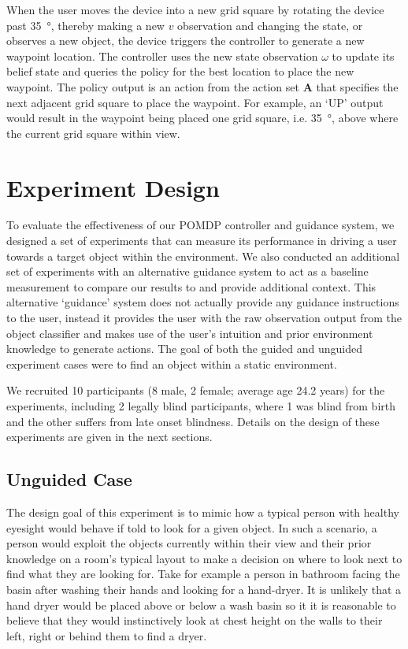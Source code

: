 \documentclass[runningheads]{llncs}
\begin{document}
When the user moves the device into a new grid square by rotating the device past \SI{35}{\degree}, thereby making a new $v$ observation and changing the state, or observes a new object, the device triggers the controller to generate a new waypoint location.
The controller uses the new state observation $\omega$ to update its belief state and queries the policy for the best location to place the new waypoint. 
The policy output is an action from the action set $\mathbf{A}$ that specifies the next adjacent grid square to place the waypoint.
For example, an `UP' output would result in the waypoint being placed one grid square, i.e. \SI{35}{\degree}, above where the current grid square within view. 

\section{Experiment Design}\label{sec:experiments}

To evaluate the effectiveness of our POMDP controller and guidance system, we designed a set of experiments that can measure its performance in driving a user towards a target object within the environment. 
We also conducted an additional set of experiments with an alternative guidance system to act as a baseline measurement to compare our results to and provide additional context. 
This alternative `guidance' system does not actually provide any guidance instructions to the user, instead it provides the user with the raw observation output from the object classifier and makes use of the user's intuition and prior environment knowledge to generate actions. 
The goal of both the guided and unguided experiment cases were to find an object within a static environment. 

We recruited 10 participants (8 male, 2 female; average age 24.2 years) for the experiments, including 2 legally blind participants, where 1 was blind from birth and the other suffers from late onset blindness.
Details on the design of these experiments are given in the next sections. 

\subsection{Unguided Case}

The design goal of this experiment is to mimic how a typical person with healthy eyesight would behave if told to look for a given object. 
In such a scenario, a person would exploit the objects currently within their view and their prior knowledge on a room's typical layout to make a decision on where to look next to find what they are looking for. 
Take for example a person in bathroom facing the basin after washing their hands and looking for a hand-dryer. 
It is unlikely that a hand dryer would be placed above or below a wash basin so it it is reasonable to believe that they would instinctively look at chest height on the walls to their left, right or behind them to find a dryer. 
\end{document}
